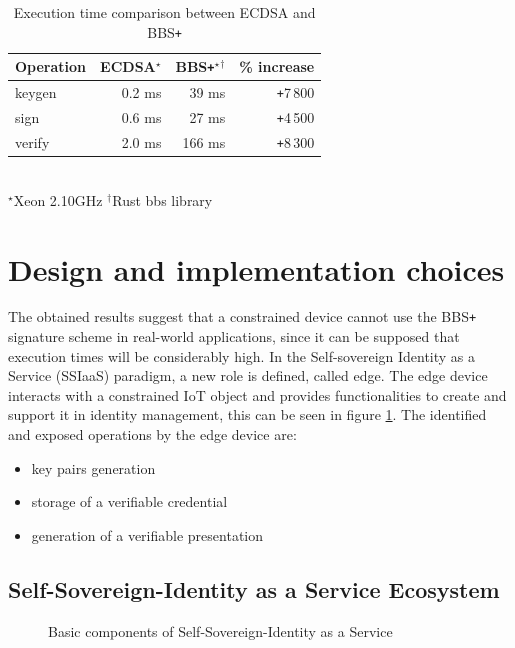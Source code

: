 \begin{table}[!h]
    \centering
    \begin{tabular}{| l || r | r | r|}
        \hline 
        \textbf{Operation} & \textbf{ECDSA}$^\star$ & \textbf{BBS\texttt{+}}$^\star$$^\dagger$ & \textbf{\% increase} \\ [0.5ex] 
        \hline  \hline 
        keygen   & 0.2   ms      & 39 ms   &\texttt{+}7\,800\\
        \hline
        sign     & 0.6   ms      & 27  ms   &\texttt{+}4\,500\\
        \hline
        verify   & 2.0  ms         & 166 ms   &\texttt{+}8\,300\\
        \hline
    \end{tabular}
    \\
    \footnotesize $^\star$Xeon 2.10GHz \enspace\enspace $^\dagger$Rust bbs library
    \caption{Execution time comparison between ECDSA and BBS\texttt{+}}
    \label{time-table2}
\end{table}

\section{Design and implementation choices}
The obtained results suggest that a constrained device cannot use the BBS\texttt{+} signature scheme in real-world applications, since it can be supposed that execution times will be considerably high. In the Self-sovereign Identity as a Service (SSIaaS) paradigm, a new role is defined, called edge. The edge device interacts with a constrained IoT object and provides functionalities to create and support it in identity management, this can be seen in figure \ref{poc-design}. The identified and exposed operations by the edge device are:
\begin{itemize}
    \item key pairs generation
    \item storage of a verifiable credential
    \item generation of a verifiable presentation
\end{itemize}

\subsection{Self-Sovereign-Identity as a Service Ecosystem}

\begin{figure}[!h]
    \centering
    
    \caption{Basic components of Self-Sovereign-Identity as a Service}
    \label{poc-design}
\end{figure}

